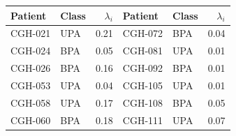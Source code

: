 \begin{tabular}{llr@{\qquad}llr}
\toprule
Patient & Class & $\lambda_i$ & Patient & Class & $\lambda_i$ \\
\midrule
CGH-021 & UPA & 0.21 & CGH-072 & BPA & 0.04 \\
CGH-024 & BPA & 0.05 & CGH-081 & UPA & 0.01 \\
CGH-026 & BPA & 0.16 & CGH-092 & BPA & 0.01 \\
CGH-053 & UPA & 0.04 & CGH-105 & UPA & 0.01 \\
CGH-058 & UPA & 0.17 & CGH-108 & BPA & 0.05 \\
CGH-060 & BPA & 0.18 & CGH-111 & UPA & 0.07 \\
\bottomrule
\end{tabular}
